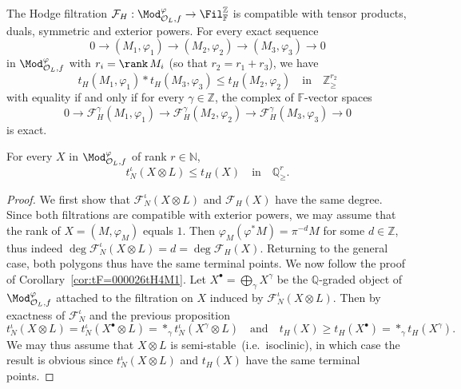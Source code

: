 \begin{prop}\label{prop:HodgeonO_L}
The Hodge filtration $\mathcal{F}_{H}:\Mod_{\mathcal{O}_{L},f}^{\varphi}\rightarrow\Fil_{\mathbb{F}}^{\mathbb{Z}}$ is compatible with tensor products, duals, symmetric and exterior powers. For every exact sequence
\[
0\rightarrow(M_{1},\varphi_{1})\rightarrow(M_{2},\varphi_{2})\rightarrow(M_{3},\varphi_{3})\rightarrow0
\]
in $\Mod_{\mathcal{O}_{L},f}^{\varphi}$ with $r_{i}=\rank\,M_{i}$ (so that $r_{2}=r_{1}+r_{3}$), we have
\[
t_{H}(M_{1},\varphi_{1})\ast t_{H}(M_{3},\varphi_{3})\leq t_{H}(M_{2},\varphi_{2})\quad\text{in}\quad\mathbb{Z}_{\geq}^{r_{2}}
\]
with equality if and only if for every $\gamma\in\mathbb{Z}$, the complex of $\mathbb{F}$-vector spaces
\[
0\rightarrow\mathcal{F}_{H}^{\gamma}(M_{1},\varphi_{1})\rightarrow\mathcal{F}_{H}^{\gamma}(M_{2},\varphi_{2})\rightarrow\mathcal{F}_{H}^{\gamma}(M_{3},\varphi_{3})\rightarrow0
\]
is exact.
\end{prop}

\begin{coro}\label{cor:Mazurinequality}
For every $X$ in $\Mod_{\mathcal{O}_{L},f}^{\varphi}$ of rank $r\in\mathbb{N}$,
\[
t_{N}^{\iota}(X\otimes L)\leq t_{H}(X)\quad\text{in}\quad\mathbb{Q}_{\geq}^{r}.
\]
\end{coro}

\begin{proof}
We first show that $\mathcal{F}_{N}^{\iota}(X\otimes L)$ and $\mathcal{F}_{H}(X)$ have the same degree. Since both filtrations are compatible with exterior powers, we may assume that the rank of $X=(M,\varphi_{M})$ equals $1$. Then $\varphi_{M}(\varphi^{\ast}M)=\pi^{-d}M$ for some $d\in\mathbb{Z}$, thus indeed $\deg\mathcal{F}_{N}^{\iota}(X\otimes L)=d=\deg\mathcal{F}_{H}(X)$. Returning to the general case, both polygons thus have the same terminal points. We now follow the proof of Corollary~\ref{cor:tF=000026tH4M1}. Let $X^{\bullet}=\bigoplus_{\gamma}X^{\gamma}$ be the $\mathbb{Q}$-graded object of $\Mod_{\mathcal{O}_{L},f}^{\varphi}$ attached to the filtration on $X$ induced by $\mathcal{F}_{N}^{\iota}(X\otimes L)$. Then by exactness of $\mathcal{F}_{N}^{\iota}$ and the previous proposition
\[
t_{N}^{\iota}(X\otimes L)=t_{N}^{\iota}(X^{\bullet}\otimes L)=\ast_{\gamma}t_{N}^{\iota}(X^{\gamma}\otimes L)\quad\text{and}\quad t_{H}(X)\geq t_{H}(X^{\bullet})=\ast_{\gamma}t_{H}(X^{\gamma}).
\]
We may thus assume that $X\otimes L$ is semi-stable~(i.e.~isoclinic), in which case the result is obvious since $t_{N}^{\iota}(X\otimes L)$ and $t_{H}(X)$ have the same terminal points.
\end{proof}


